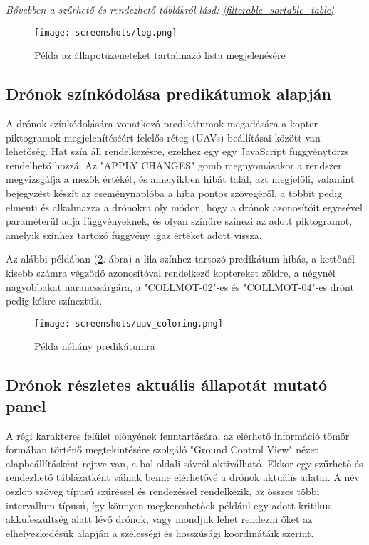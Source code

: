 \textit{
  Bővebben a szűrhető és rendezhető táblákról lásd:
  \ref{filterable_sortable_table}
}

\begin{figure}[H]
  \texttt{[image: screenshots/log.png]}
  \caption{Példa az állapotüzeneteket tartalmazó lista megjelenésére}
  \label{fig:log}
\end{figure}


\subsection{Drónok színkódolása predikátumok alapján}

A drónok színkódolására vonatkozó predikátumok megadására a kopter piktogramok
megjelenítéséért felelős réteg (UAVs) beállításai között van lehetőség.
Hat szín áll rendelkezésre, ezekhez egy egy JavaScript függvénytörzs rendelhető
hozzá. Az "APPLY CHANGES" gomb megnyomásakor a rendszer megvizsgálja a mezők
értékét, és amelyikben hibát talál, azt megjelöli, valamint bejegyzést készít az
eseménynaplóba a hiba pontos szövegéről, a többit pedig elmenti és alkalmazza a
drónokra oly módon, hogy a drónok azonosítóit egyesével paraméterül adja
függvényeknek, és olyan színűre színezi az adott piktogramot, amelyik színhez
tartozó függvény igaz értéket adott vissza.

Az alábbi példában (\ref{fig:uav_coloring}. ábra) a lila színhez tartozó
predikátum hibás, a kettőnél kisebb számra végződő azonosítóval rendelkező
koptereket zöldre, a négynél nagyobbakat narancssárgára, a "COLLMOT-02"-es és
"COLLMOT-04"-es drónt pedig kékre színeztük.

\begin{figure}[H]
  \texttt{[image: screenshots/uav\_coloring.png]}
  \caption{Példa néhány predikátumra}
  \label{fig:uav_coloring}
\end{figure}

\subsection{Drónok részletes aktuális állapotát mutató panel}

A régi karakteres felület előnyének fenntartására, az elérhető információ tömör
formában történő megtekintésére szolgáló "Ground Control View" nézet
alapbeállításként rejtve van, a bal oldali sávról aktiválható. Ekkor egy
szűrhető és rendezhető táblázatként válnak benne elérhetővé a drónok aktuális
adatai.
A név oszlop szöveg típusú szűréssel és rendezéssel rendelkezik, az összes többi
intervallum típusú, így könnyen megkereshetőek például egy adott kritikus
akkufeszültség alatt lévő drónok, vagy mondjuk lehet rendezni őket az
elhelyezkedésük alapján a szélességi és hosszúsági koordinátáik szerint.

